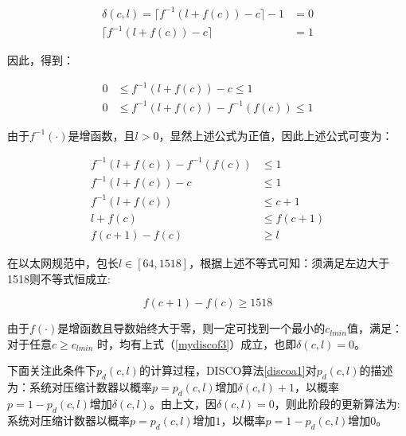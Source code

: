 \begin{align}
\delta(c,l) =  \lceil f^{-1}(l+f(c)) - c \rceil -1 &= 0 \nonumber \\
\lceil f^{-1}(l+f(c)) - c \rceil &= 1 %
\end{align}

因此，得到：


\begin{align}
0 &\leq f^{-1}(l+f(c)) - c \leq 1 \nonumber  \\
0 &\leq f^{-1}(l+f(c)) - f^{-1}(f(c)) \leq 1
\end{align}

%

由于$f^{-1}(\cdot)$是增函数，且$l>0$，显然上述公式为正值，因此上述公式可变为：


\begin{align}\label{mydiscof2}
f^{-1}(l+f(c)) - f^{-1}(f(c)) &\leq 1 \nonumber  \\
f^{-1}(l+f(c)) - c &\leq 1 \nonumber  \\
f^{-1}(l+f(c))  &\leq c + 1  \nonumber \\
l+f(c) &\leq f(c+1) \nonumber  \\
f(c+1) - f(c) &\geq l
\end{align}

在以太网规范中，包长$l \in [64,1518]$，根据上述不等式可知：须满足左边大于1518则不等式恒成立:

\begin{equation} \label{mydiscof3}
f(c+1) - f(c) \geq 1518
\end{equation}

由于$ f(\cdot) $是增函数且导数始终大于零，则一定可找到一个最小的$ c_{lmin} $值，满足：对于任意$ c \geq c_{lmin} $ 时，均有上式（\ref{mydiscof3}）成立，也即$\delta(c,l) =0$。

下面关注此条件下$ p_d(c,l) $的计算过程，DISCO算法\ref{discoa1}对$ p_d(c,l) $的描述为：系统对压缩计数器以概率$p= p_d(c,l) $增加$\delta(c,l) +1$，以概率$p=1- p_d(c,l) $增加$\delta(c,l)$。由上文，因$ \delta(c,l)=0$，则此阶段的更新算法为:系统对压缩计数器以概率$p= p_d(c,l) $增加$1$，以概率$p=1- p_d(c,l) $增加$0$。

